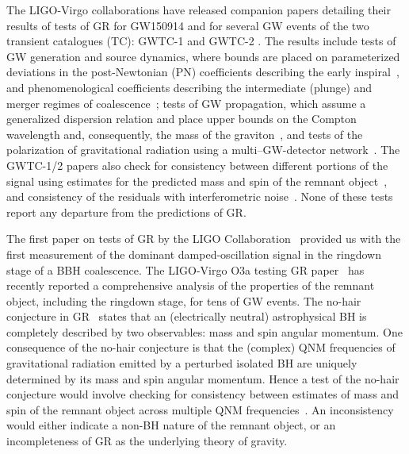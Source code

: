 \documentclass[twocolumn,prd,aps,superscriptaddress,preprintnumbers,tightenlines,showpacs,nofootinbib,eqsecnum,amsfonts,amsmath]{revtex4-1}
\begin{document}
The LIGO-Virgo collaborations have released companion papers \cite{} detailing their results 
of tests of GR for GW150914 \cite{} and for several GW events of 
the two transient catalogues (TC): GWTC-1\cite{}  and GWTC-2 \cite{}. 
The results include tests of GW generation and source dynamics, where bounds are placed on
parameterized deviations in the post-Newtonian (PN) coefficients describing
the early inspiral~\citep{earlydevelopmentpapers}, and
phenomenological coefficients describing the intermediate (plunge) and
merger regimes of coalescence~\citep{TIGERmethodspapers}; tests of GW
propagation, which assume a generalized dispersion relation and place
upper bounds on the Compton wavelength and, consequently, the mass of
the graviton~\citep{gw170104,samajdar2017projected}, and tests of the
polarization of gravitational radiation using a
multi--GW-detector network~\citep{gw170814,isi2017probing}. The GWTC-1/2 papers also 
check for consistency between different portions of the signal using estimates for the predicted mass and spin of the remnant
object~\citep{Ghosh:2016xx,Ghosh:2017gfp,LSC_2016grtests}, and
consistency of the residuals with interferometric
noise~\citep{Ghonge:2020suv,gwtc1_tgr}. None of these tests report any
departure from the predictions of GR.

The first paper on tests of GR by the LIGO Collaboration~\cite{} provided us with the 
first measurement of the dominant damped-oscillation signal in the ringdown stage of a BBH 
coalescence. The LIGO-Virgo O3a testing GR paper~\cite{} has recently reported a comprehensive analysis of the properties of the remnant object, including the ringdown stage, for tens of GW events.
The no-hair conjecture in GR~\citep{} states that an (electrically neutral) astrophysical BH is completely
described by two observables: mass and spin angular momentum. One
consequence of the no-hair conjecture is that the (complex) QNM
frequencies of gravitational radiation emitted by a perturbed isolated
BH are uniquely determined by its mass and spin angular momentum. Hence
a test of the no-hair conjecture would involve checking for
consistency between estimates of mass and spin of the remnant object
across multiple QNM frequencies~\cite{Dreyer:2003bv}. An inconsistency would either
indicate a non-BH nature of the remnant object, or an incompleteness
of GR as the underlying theory of gravity. 
\end{document}
